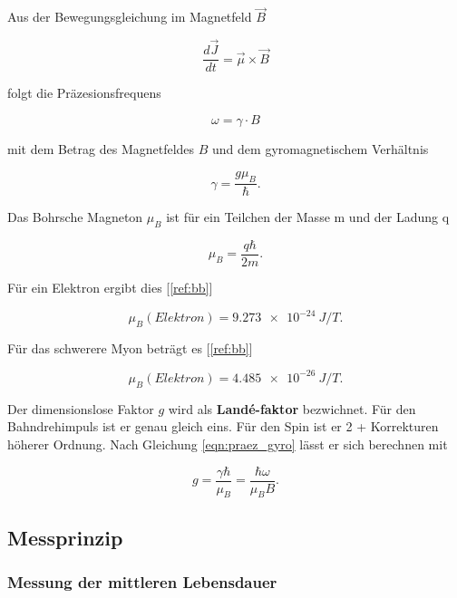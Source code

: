 \documentclass[a4paper,ngerman]{scrartcl}
\begin{document}
Aus der Bewegungsgleichung im Magnetfeld $\vec{B}$

\begin{equation}
\frac{d\vec{J}}{dt} = \vec{\mu} \times \vec{B}
\end{equation}

folgt die Präzesionsfrequens

\begin{equation}
\omega = \gamma \cdot B
\end{equation}

mit dem Betrag des Magnetfeldes $B$ und dem gyromagnetischem Verhältnis 

\begin{equation}
\label{eqn:praez_gyro}
\gamma = \frac{g \mu_B}{\hbar}. 
\end{equation}

Das Bohrsche Magneton $\mu_B$ ist für ein Teilchen der Masse m und der Ladung q

\begin{equation}
\mu_B = \frac{q\hbar}{2 m} .
\end{equation}


Für ein Elektron ergibt dies [\ref{ref:bb}]

\begin{equation}
\mu_B (Elektron) = \SI{9.273e-24}{ J/T } .
\end{equation}

Für das schwerere Myon beträgt es [\ref{ref:bb}]

\begin{equation}
\mu_B (Elektron) = \SI{4.485e-26}{ J/T } .
\end{equation} 


Der dimensionslose Faktor $g$ wird als \textbf{Landé-faktor} bezwichnet. Für den Bahndrehimpuls ist er genau gleich eins. Für den Spin ist er 2 + Korrekturen höherer Ordnung. Nach Gleichung \ref{eqn:praez_gyro} lässt er sich berechnen mit

\begin{equation}
g = \frac{\gamma \hbar}{\mu_B} = \frac{\hbar \omega}{\mu_B B} .
\end{equation}


\subsection{Messprinzip}
\label{sec:messprinzip}

\subsubsection*{Messung der mittleren Lebensdauer}
\end{document}
